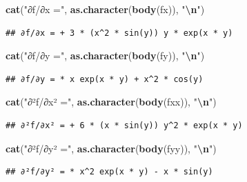 \documentclass[
]{book}
\newenvironment{Shaded}{\begin{snugshade}}{\end{snugshade}}
\newcommand{\FunctionTok}[1]{\textcolor[rgb]{0.13,0.29,0.53}{\textbf{#1}}}
\newcommand{\NormalTok}[1]{#1}
\newcommand{\SpecialCharTok}[1]{\textcolor[rgb]{0.81,0.36,0.00}{\textbf{#1}}}
\newcommand{\StringTok}[1]{\textcolor[rgb]{0.31,0.60,0.02}{#1}}
\begin{document}
\begin{Shaded}
\begin{Highlighting}[]
\FunctionTok{cat}\NormalTok{(}\StringTok{"∂f/∂x ="}\NormalTok{, }\FunctionTok{as.character}\NormalTok{(}\FunctionTok{body}\NormalTok{(fx)), }\StringTok{"}\SpecialCharTok{\textbackslash{}n}\StringTok{"}\NormalTok{)}
\end{Highlighting}
\end{Shaded}

\begin{verbatim}
## ∂f/∂x = + 3 * (x^2 * sin(y)) y * exp(x * y)
\end{verbatim}

\begin{Shaded}
\begin{Highlighting}[]
\FunctionTok{cat}\NormalTok{(}\StringTok{"∂f/∂y ="}\NormalTok{, }\FunctionTok{as.character}\NormalTok{(}\FunctionTok{body}\NormalTok{(fy)), }\StringTok{"}\SpecialCharTok{\textbackslash{}n}\StringTok{"}\NormalTok{)}
\end{Highlighting}
\end{Shaded}

\begin{verbatim}
## ∂f/∂y = * x exp(x * y) + x^2 * cos(y)
\end{verbatim}

\begin{Shaded}
\begin{Highlighting}[]
\FunctionTok{cat}\NormalTok{(}\StringTok{"∂²f/∂x² ="}\NormalTok{, }\FunctionTok{as.character}\NormalTok{(}\FunctionTok{body}\NormalTok{(fxx)), }\StringTok{"}\SpecialCharTok{\textbackslash{}n}\StringTok{"}\NormalTok{)}
\end{Highlighting}
\end{Shaded}

\begin{verbatim}
## ∂²f/∂x² = + 6 * (x * sin(y)) y^2 * exp(x * y)
\end{verbatim}

\begin{Shaded}
\begin{Highlighting}[]
\FunctionTok{cat}\NormalTok{(}\StringTok{"∂²f/∂y² ="}\NormalTok{, }\FunctionTok{as.character}\NormalTok{(}\FunctionTok{body}\NormalTok{(fyy)), }\StringTok{"}\SpecialCharTok{\textbackslash{}n}\StringTok{"}\NormalTok{)}
\end{Highlighting}
\end{Shaded}

\begin{verbatim}
## ∂²f/∂y² = * x^2 exp(x * y) - x * sin(y)
\end{verbatim}
\end{document}
